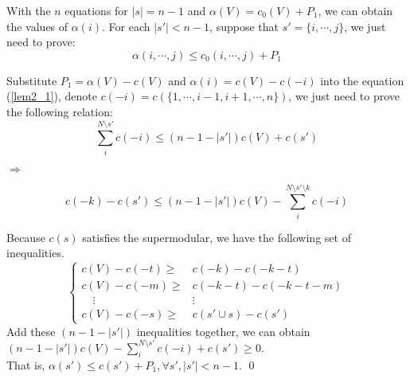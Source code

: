 \begin{pf}[Lemma 4]
With the $n$ equations for $\left| s \right|= n-1$ and $\alpha(V)=c_0(V)+P_1$, we can obtain the values of $\alpha(i)$. For each $\left| s' \right| < n-1$, suppose that $s'=\{i,\cdots,j\}$, we just need to prove:
\begin{equation} \label{lem2_1}
  \alpha(i,\cdots,j) \leq c_0(i,\cdots,j)+P_1
\end{equation}

Substitute $P_1=\alpha(V)-c(V)$ and $\alpha(i) = c(V)-c(-i)$ into the equation (\ref{lem2_1}), denote $c(-i)=c(\{1,\cdots,i-1,i+1,\cdots,n\})$, we just need to prove the following relation:
\begin{equation}   \label{lem2_2}
  \sum_i^{N\setminus s'} c(-i) \leq (n-1-\left| s' \right|)c(V)+c(s')
\end{equation}

$\Rightarrow \qquad$

\begin{equation*}
  c(-k)-c(s') \leq (n-1-\left| s' \right|)c(V)-\sum_i^{N\setminus s'\setminus k} c(-i)
\end{equation*}

Because $c(s)$ satisfies the supermodular, we have the following set of inequalities.
\[
\begin{cases}
  c(V)-c(-t) \geq & c(-k)-c(-k-t) \\
  c(V)-c(-m) \geq & c(-k-t)-c(-k-t-m) \\
 \quad   \vdots        &\vdots\\
 c(V)-c(-s) \geq & c(s' \cup s)-c(s')
\end{cases}
\]
Add these $(n-1-\left| s' \right|)$ inequalities together, we can obtain $(n-1-\left| s' \right|)c(V)- \sum_i^{N\setminus s'} c(-i)+c(s') \geq 0 $. \\
That is, $\alpha(s') \leq c(s')+P_1, \forall s', \left|s' \right|<n-1$.
\qed
\end{pf}
